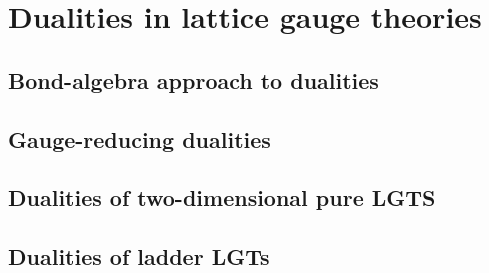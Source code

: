 \chapter{Dualities in lattice gauge theories}
\label{chap:dualities_in_lattice_gauge_theories}


\section{Bond-algebra approach to dualities}
\label{sec:bond_algebra_approach_to_dualities}


\section{Gauge-reducing dualities}
\label{sec:gauge_reducing_dualities}


\section{Dualities of two-dimensional pure LGTS}
\label{sec:dualities_of_two_dimensional_pure_lgts}


\section{Dualities of ladder LGTs}
\label{sec:dualities_of_ladder_lgts}
